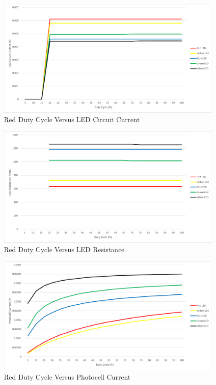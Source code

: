 \documentclass[12pt,titlepage]{article}
\begin{document}
\begin{figure}[!htb]
  \centering
  \includegraphics[width=5in]{lab_4/duty_cycle_led_circuit_curr.png}
  \caption{Red Duty Cycle Versus LED Circuit Current}
\end{figure}
\begin{figure}[!htb]
  \centering
  \includegraphics[width=5in]{lab_4/duty_cycle_led_res.png}
  \caption{Red Duty Cycle Versus LED Resistance}
\end{figure}
\begin{figure}[!htb]
  \centering
  \includegraphics[width=5in]{lab_4/duty_cycle_photo_curr.png}
  \caption{Red Duty Cycle Versus Photocell Current}
\end{figure}
\end{document}
